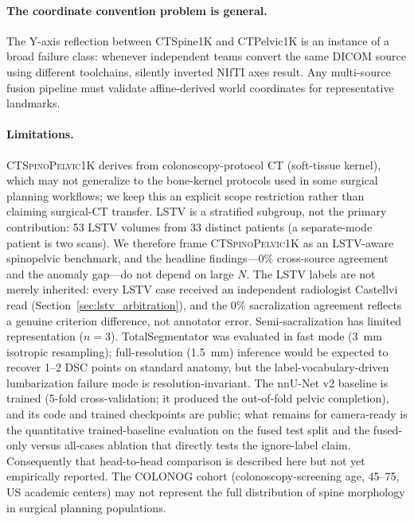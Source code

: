 \documentclass[pmlr]{jmlr}
\newcommand{\dataset}{\textsc{CTSpinoPelvic1K}}
\begin{document}
\paragraph{The coordinate convention problem is general.}
The Y-axis reflection between CTSpine1K and CTPelvic1K is an
instance of a broad failure class: whenever independent teams
convert the same DICOM source using different toolchains, silently
inverted NIfTI axes result.
Any multi-source fusion pipeline must validate affine-derived world
coordinates for representative landmarks.

\paragraph{Limitations.}
\dataset{} derives from colonoscopy-protocol CT (soft-tissue kernel),
which may not generalize to the bone-kernel protocols used in some
surgical planning workflows; we keep this an explicit scope
restriction rather than claiming surgical-CT transfer.
LSTV is a stratified subgroup, not the primary contribution: 53 LSTV
volumes from 33 distinct patients (a separate-mode patient is two
scans). We therefore frame \dataset{} as an LSTV-aware spinopelvic
benchmark, and the headline findings---0\% cross-source agreement and
the anomaly gap---do not depend on large $N$. The LSTV labels are not
merely inherited: every LSTV case received an independent radiologist
Castellvi read (Section~\ref{sec:lstv_arbitration}), and the 0\%
sacralization agreement reflects a genuine criterion difference, not
annotator error. Semi-sacralization has limited representation
($n=3$).
TotalSegmentator was evaluated in fast mode (3~mm isotropic
resampling); full-resolution (1.5~mm) inference would be expected
to recover 1--2 DSC points on standard anatomy, but the
label-vocabulary-driven lumbarization failure mode is
resolution-invariant.
The nnU-Net v2 baseline is trained (5-fold cross-validation; it
produced the out-of-fold pelvic completion), and its code and
trained checkpoints are public; what remains for camera-ready is the
quantitative trained-baseline evaluation on the fused test split and
the fused-only versus all-cases ablation that directly tests the
ignore-label claim. Consequently that head-to-head comparison is
described here but not yet empirically reported.
The COLONOG cohort (colonoscopy-screening age, 45--75, US academic
centers) may not represent the full distribution of spine morphology
in surgical planning populations.
\end{document}
